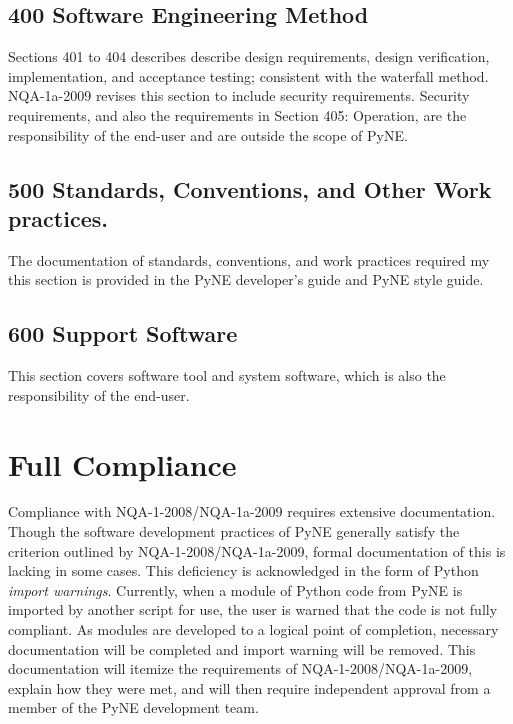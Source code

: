 \documentclass{anstrans}
\begin{document}


\subsection{400 Software Engineering Method}

Sections 401 to 404 describes describe design requirements, design
verification, implementation, and acceptance testing; consistent with the
waterfall method. NQA-1a-2009 revises this section to include security
requirements. Security requirements, and also the requirements in Section 405:
Operation, are the responsibility of the end-user and are outside the scope of
PyNE.


\subsection{500 Standards, Conventions, and Other Work practices.}

The documentation of standards, conventions, and work practices required my
this section is provided in the PyNE developer's guide and PyNE style guide.

\subsection{600 Support Software}
This section covers software tool and system software, which is also the responsibility of the end-user.

\section{Full Compliance}

Compliance with NQA-1-2008/NQA-1a-2009 requires extensive documentation.
Though the software development practices of PyNE generally satisfy the
criterion outlined by NQA-1-2008/NQA-1a-2009, formal documentation of this is
lacking in some cases. This deficiency is acknowledged in the form of Python \emph{import
warnings}. Currently, when a module of Python code from PyNE is imported by
another script for use, the user is warned that the code is not fully
compliant. As modules are developed to a logical point of completion, necessary
documentation will be completed and import warning will be removed. 
This documentation will itemize the requirements of NQA-1-2008/NQA-1a-2009,
explain how they were met, and will then require independent approval from a
member of the PyNE development team.
\end{document}
